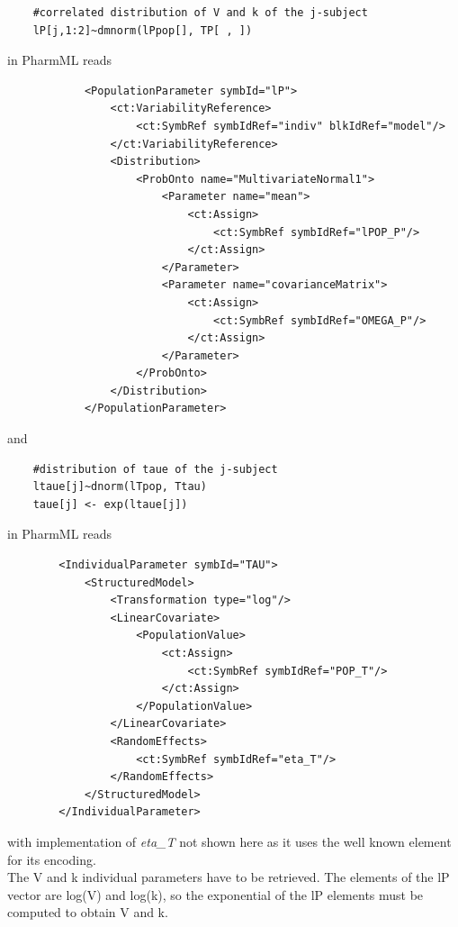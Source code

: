 \lstset{language=MLX}
\begin{lstlisting}
	#correlated distribution of V and k of the j-subject
	lP[j,1:2]~dmnorm(lPpop[], TP[ , ])
\end{lstlisting}
in PharmML reads
\lstset{language=XML}
\begin{lstlisting}
            <PopulationParameter symbId="lP">
                <ct:VariabilityReference>
                    <ct:SymbRef symbIdRef="indiv" blkIdRef="model"/>
                </ct:VariabilityReference>
                <Distribution>
                    <ProbOnto name="MultivariateNormal1">
                        <Parameter name="mean">
                            <ct:Assign>
                                <ct:SymbRef symbIdRef="lPOP_P"/>
                            </ct:Assign>
                        </Parameter>
                        <Parameter name="covarianceMatrix">
                            <ct:Assign>
                                <ct:SymbRef symbIdRef="OMEGA_P"/>
                            </ct:Assign>
                        </Parameter>
                    </ProbOnto> 
                </Distribution>
            </PopulationParameter>
\end{lstlisting}
and
\lstset{language=MLX}
\begin{lstlisting}
	#distribution of taue of the j-subject
	ltaue[j]~dnorm(lTpop, Ttau)
	taue[j] <- exp(ltaue[j])
\end{lstlisting}
in PharmML reads
\lstset{language=XML}
\begin{lstlisting}
        <IndividualParameter symbId="TAU">
            <StructuredModel>
                <Transformation type="log"/>
                <LinearCovariate>
                    <PopulationValue>
                        <ct:Assign>
                            <ct:SymbRef symbIdRef="POP_T"/>
                        </ct:Assign>
                    </PopulationValue>
                </LinearCovariate>
                <RandomEffects>
                    <ct:SymbRef symbIdRef="eta_T"/>
                </RandomEffects>
            </StructuredModel>
        </IndividualParameter>
\end{lstlisting}
with implementation of \emph{eta\_T} not shown here as it uses the 
well known  element for its encoding.\\
The V and k individual parameters have to be retrieved. The elements of the lP vector 
are log(V) and log(k), so the exponential of the lP elements must be computed to obtain V and k.

